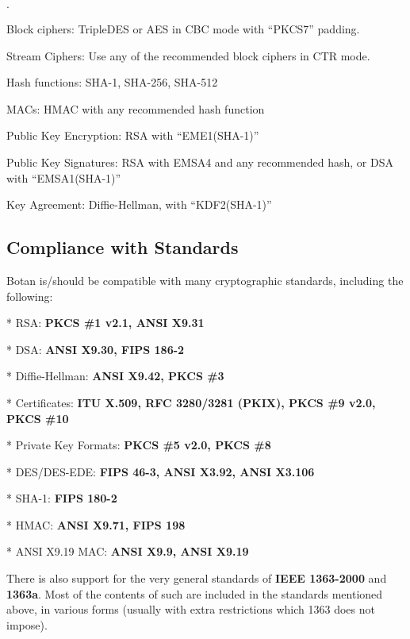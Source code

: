 \documentclass{article}
\begin{document}
\begin{list}{$\cdot$}
  \item Block ciphers: TripleDES or AES in CBC mode with ``PKCS7'' padding.
  \item

  \item Stream Ciphers: Use any of the recommended block ciphers in CTR mode.

  \item Hash functions: SHA-1, SHA-256, SHA-512

  \item MACs: HMAC with any recommended hash function

  \item Public Key Encryption: RSA with ``EME1(SHA-1)''

  \item Public Key Signatures: RSA with EMSA4 and any recommended hash, or DSA
     with ``EMSA1(SHA-1)''

  \item Key Agreement: Diffie-Hellman, with ``KDF2(SHA-1)''
\end{list}

\subsection{Compliance with Standards}

Botan is/should be compatible with many cryptographic standards, including the
following:

\newcommand{\standard}[2]{
   \vskip 4pt
   * #1: \textbf{#2}
}

\standard{RSA}{PKCS \#1 v2.1, ANSI X9.31}

\standard{DSA}{ANSI X9.30, FIPS 186-2}

\standard{Diffie-Hellman}{ANSI X9.42, PKCS \#3}

\standard{Certificates}{ITU X.509, RFC 3280/3281 (PKIX), PKCS \#9 v2.0,
PKCS \#10}

\standard{Private Key Formats}{PKCS \#5 v2.0, PKCS \#8}

\standard{DES/DES-EDE}{FIPS 46-3, ANSI X3.92, ANSI X3.106}

\standard{SHA-1}{FIPS 180-2}

\standard{HMAC}{ANSI X9.71, FIPS 198}

\standard{ANSI X9.19 MAC}{ANSI X9.9, ANSI X9.19}

\vskip 8pt
\noindent
There is also support for the very general standards of \textbf{IEEE 1363-2000}
and \textbf{1363a}. Most of the contents of such are included in the standards
mentioned above, in various forms (usually with extra restrictions which 1363
does not impose).
\end{document}
